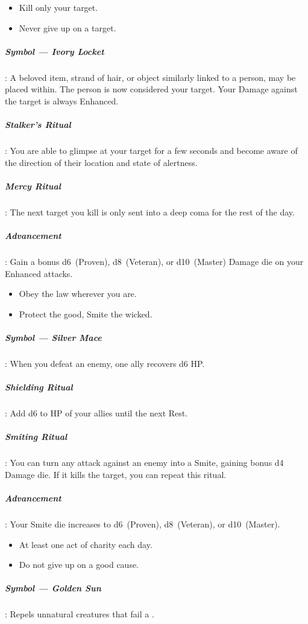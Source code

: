 \documentclass[itdr]{subfiles}
\begin{document}
\vfill

{\em\begin{itemize}
		\item Kill only your target.
		\item Never give up on a target.
\end{itemize}}

\subparagraph{Symbol --- Ivory Locket}: A beloved item, strand of hair, or object similarly linked to a person, may be placed within. The person is now considered your target. Your Damage against the target is always Enhanced.

\subparagraph{Stalker's Ritual}: You are able to glimpse at your target for a few seconds and become aware of the direction of their location and state of alertness.

\subparagraph{Mercy Ritual}: The next target you kill is only sent into a deep coma for the rest of the day.

\subparagraph{Advancement}: Gain a bonus d6~(Proven), d8~(Veteran), or d10~(Master) Damage die on your Enhanced attacks.

\vfill

{\em\begin{itemize}
		\item Obey the law wherever you are.
		\item Protect the good, Smite the wicked.
\end{itemize}}

\subparagraph{Symbol --- Silver Mace}: When you defeat an enemy, one ally recovers d6 HP.

\subparagraph{Shielding Ritual}: Add d6 to HP of your allies until the next Rest.

\subparagraph{Smiting Ritual}: You can turn any attack against an enemy into a Smite, gaining bonus d4 Damage die. If it kills the target, you can repeat this ritual.

\subparagraph{Advancement}: Your Smite die increases to d6~(Proven), d8~(Veteran), or d10~(Master).

\vfill

{\em\begin{itemize}
		\item At least one act of charity each day.
		\item Do not give up on a good cause.
\end{itemize}}

\subparagraph{Symbol --- Golden Sun}: Repels unnatural creatures that fail a .
\end{document}
